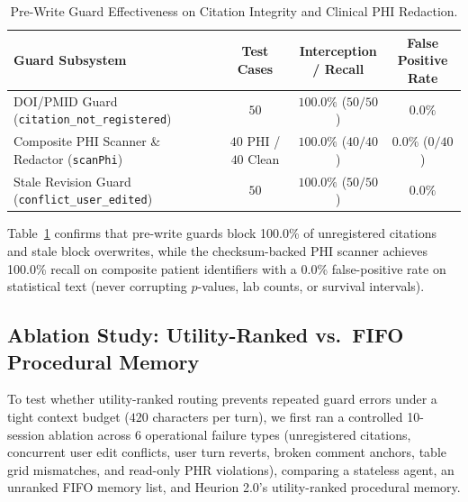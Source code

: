 \documentclass[11pt,a4paper]{article}
\makeatletter
\newcommand{\thead}[1]{\begin{tabular}[c]{@{}c@{}}#1\end{tabular}}
\makeatother
\begin{document}
\begin{table}[!t]
\centering
\caption{Pre-Write Guard Effectiveness on Citation Integrity and Clinical PHI Redaction.}
\label{tab:guards}
\vspace{2pt}
\small
\setlength{\tabcolsep}{0pt}
\begin{tabular*}{\textwidth}{@{\extracolsep{\fill}}lccc@{}}
\toprule
\textbf{Guard Subsystem} & \thead{\textbf{Test}\\\textbf{Cases}} & \thead{\textbf{Interception}\\\textbf{/ Recall}} & \thead{\textbf{False Positive}\\\textbf{Rate}} \\
\midrule
DOI/PMID Guard (\texttt{citation\_not\_registered}) & $50$ & $\mathbf{100.0\%}$ ($50/50$) & $0.0\%$ \\
Composite PHI Scanner \& Redactor (\texttt{scanPhi}) & $40$ PHI / $40$ Clean & $\mathbf{100.0\%}$ ($40/40$) & $\mathbf{0.0\%}$ ($0/40$) \\
Stale Revision Guard (\texttt{conflict\_user\_edited}) & $50$ & $\mathbf{100.0\%}$ ($50/50$) & $0.0\%$ \\
\bottomrule
\end{tabular*}
\end{table}

Table~\ref{tab:guards} confirms that pre-write guards block 100.0\% of unregistered citations and stale block overwrites, while the checksum-backed PHI scanner achieves 100.0\% recall on composite patient identifiers with a 0.0\% false-positive rate on statistical text (never corrupting $p$-values, lab counts, or survival intervals).

\subsection{Ablation Study: Utility-Ranked vs.\ FIFO Procedural Memory}
To test whether utility-ranked routing prevents repeated guard errors under a tight context budget ($420$ characters per turn), we first ran a controlled 10-session ablation across 6 operational failure types (unregistered citations, concurrent user edit conflicts, user turn reverts, broken comment anchors, table grid mismatches, and read-only PHR violations), comparing a stateless agent, an unranked FIFO memory list, and Heurion 2.0's utility-ranked procedural memory.
\end{document}
